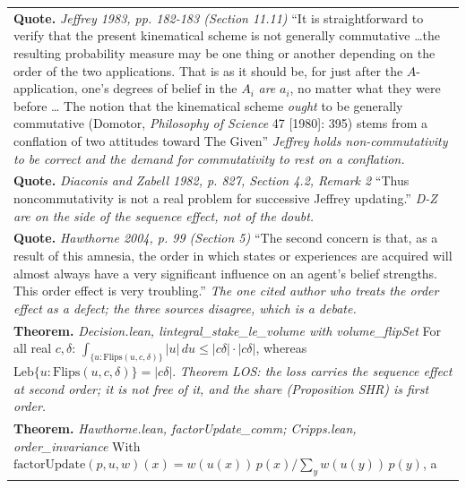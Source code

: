 \documentclass[10pt]{article}
\theoremstyle{definition}
\newlength{\fullw}\setlength{\fullw}{25.9cm}
\begin{document}
{\begin{longtable}{|p{0.9cm}|p{12.2cm}|p{12.2cm}|}
\multicolumn{3}{|p{\fullw}|}{\textbf{Quote.} \textit{Jeffrey 1983, pp. 182-183 (Section 11.11)} \newline ``It is straightforward to verify that the present kinematical
scheme is not generally commutative \ldots the resulting probability measure
may be one thing or another depending on the order of the two applications.
That is as it should be, for just after the $A$-application, one's degrees of
belief in the $A_i$ \emph{are} $a_i$, no matter what they were before \ldots
The notion that the kinematical scheme \emph{ought} to be generally commutative
(Domotor, \emph{Philosophy of Science} 47 [1980]: 395) stems from a conflation
of two attitudes toward The Given'' \newline \textit{Jeffrey holds non-commutativity to be correct and the demand for
commutativity to rest on a conflation.}} \\
\multicolumn{3}{|p{\fullw}|}{\textbf{Quote.} \textit{Diaconis and Zabell 1982, p. 827, Section 4.2, Remark 2} \newline ``Thus noncommutativity is not a real problem for successive
Jeffrey updating.'' \newline \textit{D-Z are on the side of the sequence effect, not of the doubt.}} \\
\multicolumn{3}{|p{\fullw}|}{\textbf{Quote.} \textit{Hawthorne 2004, p. 99 (Section 5)} \newline ``The second concern is that, as a result of this amnesia, the
order in which states or experiences are acquired will almost always have a
very significant influence on an agent's belief strengths. This order effect
is very troubling.'' \newline \textit{The one cited author who treats the order effect as a defect; the
three sources disagree, which is a debate.}} \\
\multicolumn{3}{|p{\fullw}|}{\textbf{Theorem.} \textit{Decision.lean, lintegral\_stake\_le\_volume with volume\_flipSet} \newline For all real $c,\delta$:
$\int_{\{u:\mathrm{Flips}(u,c,\delta)\}} |u|\,du \le |c\delta|\cdot|c\delta|$,
whereas $\mathrm{Leb}\{u:\mathrm{Flips}(u,c,\delta)\} = |c\delta|$. \newline \textit{Theorem LOS: the loss carries the sequence effect at second order;
it is not free of it, and the share (Proposition SHR) is first order.}} \\
\multicolumn{3}{|p{\fullw}|}{\textbf{Theorem.} \textit{Hawthorne.lean, factorUpdate\_comm; Cripps.lean, order\_invariance} \newline With $\mathrm{factorUpdate}(p,u,w)(x)=w(u(x))\,p(x)/\sum_y w(u(y))\,p(y)$, a
}
\end{longtable}}
\end{document}
